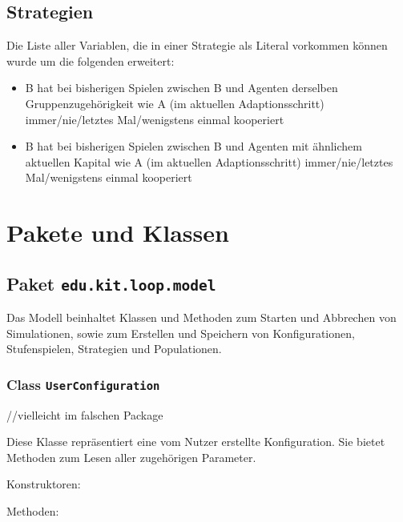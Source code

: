 \documentclass[parskip=full,11pt]{scrartcl}
\begin{document}
\subsection{Strategien}
Die Liste aller Variablen, die in einer Strategie als Literal vorkommen können wurde um die folgenden erweitert:

\begin{itemize}
\item B hat bei bisherigen Spielen zwischen B und Agenten derselben Gruppenzugehörigkeit wie A (im aktuellen Adaptionsschritt) immer/nie/letztes Mal/wenigstens einmal kooperiert
\item B hat bei bisherigen Spielen zwischen B und Agenten mit ähnlichem aktuellen Kapital wie A (im aktuellen Adaptionsschritt) immer/nie/letztes Mal/wenigstens einmal kooperiert
\end{itemize}

\section{Pakete und Klassen}
\subsection{Paket \texttt{edu.kit.loop.model}}
Das Modell beinhaltet Klassen und Methoden zum Starten und Abbrechen von Simulationen, sowie zum Erstellen und Speichern von Konfigurationen, Stufenspielen, Strategien und Populationen.

\subsubsection{Class \texttt{UserConfiguration}}
//vielleicht im falschen Package

Diese Klasse repräsentiert eine vom Nutzer erstellte Konfiguration. Sie bietet Methoden zum Lesen aller zugehörigen Parameter.

Konstruktoren:

Methoden:
\end{document}

